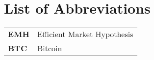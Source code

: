 \section*{List of Abbreviations}

\begin{tabularx}{\textwidth}{@{}lL{0.8\textwidth}@{}}
    \textbf{EMH} & Efficient Market Hypothesis \\
    \textbf{BTC} & Bitcoin                     \\
\end{tabularx}